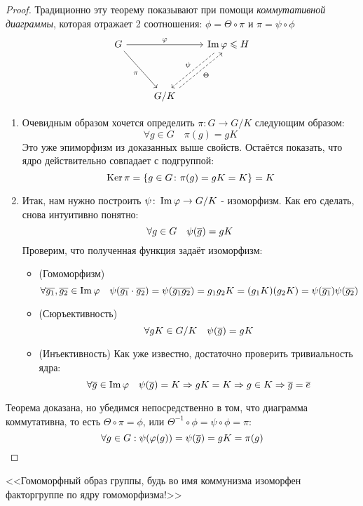 \begin{proof}
	Традиционно эту теорему показывают при помощи \textit{коммутативной диаграммы}, которая отражает 2 соотношения: $\phi = \Theta \circ \pi$ и $\pi = \psi \circ \phi$
	\[
	\begin{tikzcd}[row sep = huge]
		G \arrow{rr}{\phi} \arrow[swap]{dr}{\pi} && \im \phi \le H \arrow[dashrightarrow, swap, xshift = -4pt]{dl}{\psi}\\
		& G / K \arrow[dashrightarrow, swap, xshift = 4pt]{ur}{\Theta} &
	\end{tikzcd}
	\]
	\begin{enumerate}
		\item Очевидным образом хочется определить $\pi \colon G \to G / K$ следующим образом:
		\[
			\forall g \in G \quad \pi(g) = gK
		\]
		Это уже эпиморфизм из доказанных выше свойств. Остаётся показать, что ядро действительно совпадает с подгруппой:
		\[
			\operatorname{Ker} \pi = \{g \in G \colon \pi(g) = gK = K\} = K
		\]
		
		\item Итак, нам нужно построить $\psi \colon \operatorname{Im} \varphi \to G / K$ - изоморфизм. Как его сделать, снова интуитивно понятно:
		\[
			\forall g \in G \quad \psi(\overline{g}) = gK
		\]
		Проверим, что полученная функция задаёт изоморфизм:
		\begin{itemize}
			\item (Гомоморфизм)
			\[
				\forall \overline{g_1}, \overline{g_2} \in \operatorname{Im} \varphi \quad \psi(\overline{g_1} \cdot \overline{g_2}) = \psi(\overline{g_1 g_2}) = g_1 g_2 K = (g_1 K)(g_2 K) = \psi(\overline{g_1}) \psi(\overline{g_2})
			\]
			
			\item (Сюръективность)
			\[
				\forall gK \in G / K \quad \psi(\overline{g}) = gK
			\]
			
			\item (Инъективность) Как уже известно, достаточно проверить тривиальность ядра:
			\[
				\forall \overline{g} \in \operatorname{Im} \varphi \quad \psi(\overline{g}) = K \Rightarrow gK = K \Rightarrow g \in K \Rightarrow \overline{g} = \overline{e}
			\]
		\end{itemize}
	\end{enumerate}
	Теорема доказана, но убедимся непосредственно в том, что диаграмма коммутативна, то есть $\Theta \circ \pi = \phi$, или $\Theta^{-1} \circ \phi = \psi \circ \phi = \pi$:
	\[
		\forall g \in G: \psi(\varphi(g)) = \psi(\overline{g}) = gK = \pi(g)
	\]
\end{proof}

\begin{note}
	<<Гомоморфный образ группы, будь во имя коммунизма изоморфен факторгруппе по ядру гомоморфизма!>>
\end{note}

